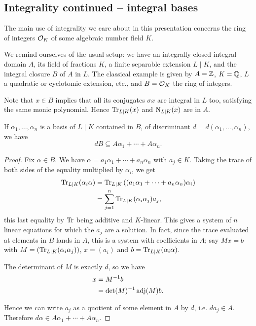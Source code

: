 \subsection{Integrality continued -- integral bases}


The main use of integrality we care about in this presentation concerns the ring of integers $\mathcal{O}_K$ of some algebraic number field $K$. 

We remind ourselves of the usual setup: we have an integrally closed integral domain $A$, its field of fractions $K$, a finite separable extension $L\mid K$, and the integral closure $B$ of $A$ in $L$. The classical example is given by $A=\mathbb{Z}$, $K=\mathbb{Q}$, $L$ a quadratic or cyclotomic extension, etc., and $B=\mathcal{O}_K$ the ring of integers.

Note that $x\in B$ implies that all its conjugates $\sigma x$ are integral in $L$ too, satisfying the same monic polynomial. Hence $\operatorname{Tr}_{L\mid K}(x)$ and $\operatorname{N}_{L\mid K}(x)$ are in $A$.

\begin{lem}
	If $\alpha_1,\dots,\alpha_n$ is a basis of $L\mid K$ contained in $B$, of discriminant $d=d(\alpha_1,\dots,\alpha_n)$, we have
	\[
		dB\subseteq A\alpha_1 + \cdots + A\alpha_n.
	\]
\end{lem}
\begin{proof}
	Fix $\alpha\in B$. We have $\alpha=a_1\alpha_1+\cdots+a_n\alpha_n$ with $a_j\in K$. Taking the trace of both sides of the equality multiplied by $\alpha_i$, we get
	\begin{align*}
		\operatorname{Tr}_{L\mid K}(\alpha_i \alpha) &= \operatorname{Tr}_{L\mid K}\left((a_1\alpha_1+\cdots+a_n\alpha_n)\alpha_i\right)\\
			&= \sum_{j=1}^n \operatorname{Tr}_{L\mid K}(\alpha_i\alpha_j) a_j,
	\end{align*}
	this last equality by $\operatorname{Tr}$ being additive and $K$-linear. This gives a system of $n$ linear equations for which the $a_j$ are a solution. In fact, since the trace evaluated at elements in $B$ lands in $A$, this is a system with coefficients in $A$; say $Mx=b$ with $M=(\operatorname{Tr}_{L\mid K}(\alpha_i\alpha_j))$, $x=(a_i)$ and $b=\operatorname{Tr}_{L\mid K}(\alpha_i\alpha)$.

	The determinant of $M$ is exactly $d$, so we have
	\begin{align*}
		x &= M^{-1} b\\
		  &= \det(M)^{-1}\operatorname{adj}(M)b.
	\end{align*}
	
	Hence we can write $a_j$ as a quotient of some element in $A$ by $d$, i.e. $da_j\in A$. Therefore $d\alpha\in A\alpha_1+\cdots+A\alpha_n$.
\end{proof}

